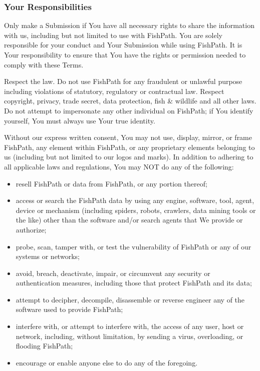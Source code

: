 \documentclass[11pt,]{book}
\providecommand{\tightlist}{%
  \setlength{\itemsep}{0pt}\setlength{\parskip}{0pt}}
\begin{document}
\hypertarget{your-responsibilities}{%
\subsubsection*{Your Responsibilities}\label{your-responsibilities}}

Only make a Submission if You have all necessary rights to share the information with us, including but not limited to use with FishPath. You are solely responsible for your conduct and Your Submission while using FishPath. It is Your responsibility to ensure that You have the rights or permission needed to comply with these Terms.

Respect the law. Do not use FishPath for any fraudulent or unlawful purpose including violations of statutory, regulatory or contractual law. Respect copyright, privacy, trade secret, data protection, fish \& wildlife and all other laws. Do not attempt to impersonate any other individual on FishPath; if You identify yourself, You must always use Your true identity.

Without our express written consent, You may not use, display, mirror, or frame FishPath, any element within FishPath, or any proprietary elements belonging to us (including but not limited to our logos and marks). In addition to adhering to all applicable laws and regulations, You may NOT do any of the following:

\begin{itemize}
\tightlist
\item
  resell FishPath or data from FishPath, or any portion thereof;
\item
  access or search the FishPath data by using any engine, software, tool, agent, device or mechanism (including spiders, robots, crawlers, data mining tools or the like) other than the software and/or search agents that We provide or authorize;
\item
  probe, scan, tamper with, or test the vulnerability of FishPath or any of our systems or networks;
\item
  avoid, breach, deactivate, impair, or circumvent any security or authentication measures, including those that protect FishPath and its data;
\item
  attempt to decipher, decompile, disassemble or reverse engineer any of the software used to provide FishPath;
\item
  interfere with, or attempt to interfere with, the access of any user, host or network, including, without limitation, by sending a virus, overloading, or flooding FishPath;
\item
  encourage or enable anyone else to do any of the foregoing.
\end{itemize}
\end{document}
